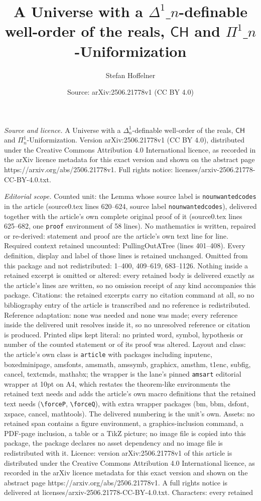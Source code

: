 \documentclass[10pt,a4paper]{amsart}
\title[A Universe with a $\Delta^1\_n$-definable well-order of the r]{A Universe with a $\Delta^1\_n$-definable well-order of the reals, $\mathsf{CH}$ and $\Pi^1\_n$-Uniformization}
\author{Stefan Hoffelner}
\date{Source: arXiv:2506.21778v1 (CC BY 4.0)}
\begin{document}
\maketitle

\noindent\emph{Source and licence.} A Universe with a $\Delta^1_n$-definable well-order of the reals, $\mathsf{CH}$ and $\Pi^1_n$-Uniformization. Version arXiv:2506.21778v1 (CC BY 4.0), distributed under the Creative Commons Attribution 4.0 International licence, as recorded in the arXiv licence metadata for this exact version and shown on the abstract page https://arxiv.org/abs/2506.21778v1. Full rights notice: licenses/arxiv-2506.21778-CC-BY-4.0.txt.\par\smallskip

\noindent\textit{Editorial scope.} Counted unit: the Lemma whose source label is \texttt{nounwantedcodes} in the article (source0.tex lines 620--624, source label \texttt{nounwantedcodes}), delivered together with the article's own complete original proof of it (source0.tex lines 625--682, one \texttt{proof} environment of 58 lines). No mathematics is written, repaired or re-derived: statement and proof are the article's own text line for line. Required context retained uncounted: PullingOutATree (lines 401--408). Every definition, display and label of those lines is retained unchanged. Omitted from this package and not redistributed: 1--400, 409--619, 683--1126. Nothing inside a retained excerpt is omitted or altered: every retained body is delivered exactly as the article's lines are written, so no omission receipt of any kind accompanies this package. Citations: the retained excerpts carry no citation command at all, so no bibliography entry of the article is transcribed and no reference is redistributed. Reference adaptation: none was needed and none was made; every reference inside the delivered unit resolves inside it, so no unresolved reference or citation is produced. Printed slips kept literal: no printed word, symbol, hypothesis or number of the counted statement or of its proof was altered. Layout and class: the article's own class is \texttt{article} with packages including inputenc, boxedminipage, amsfonts, amsmath, amssymb, graphicx, amsthm, t1enc, subfig, cancel, textcmds, mathabx; the wrapper is the lane's pinned \texttt{amsart} editorial wrapper at 10pt on A4, which restates the theorem-like environments the retained text needs and adds the article's own macro definitions that the retained text needs (\texttt{\textbackslash forceP}, \texttt{\textbackslash forceQ}), with extra wrapper packages (bm, bbm, dsfont, xspace, cancel, mathtools). The delivered numbering is the unit's own. Assets: no retained span contains a figure environment, a graphics-inclusion command, a PDF-page inclusion, a table or a TikZ picture; no image file is copied into this package, the package declares no asset dependency and no image file is redistributed with it. Licence: version arXiv:2506.21778v1 of this article is distributed under the Creative Commons Attribution 4.0 International licence, as recorded in the arXiv licence metadata for this exact version and shown on the abstract page https://arxiv.org/abs/2506.21778v1. A full rights notice is delivered at licenses/arxiv-2506.21778-CC-BY-4.0.txt. Characters: every retained 
\end{document}
